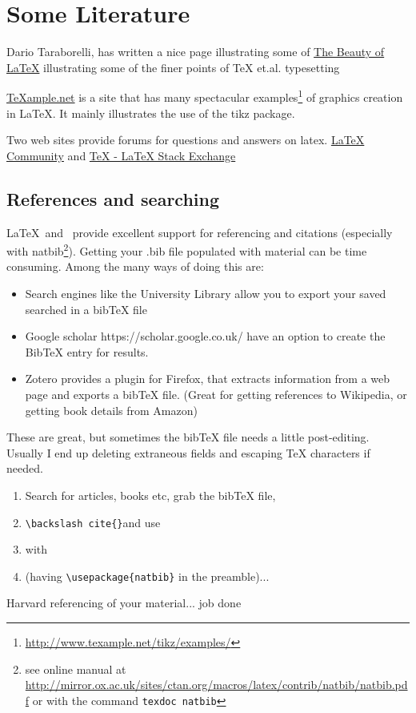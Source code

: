 
\chapter{Some Literature}

Dario Taraborelli, has written a nice page illustrating some of \href{http://nitens.org/taraborelli/latex}{The Beauty of LaTeX} illustrating some of the finer points of TeX et.al. typesetting

\url{TeXample.net} is a site that has many spectacular examples\footnote{\url{http://www.texample.net/tikz/examples/}} of graphics creation in LaTeX. It mainly illustrates the use of the tikz package.

Two web sites provide forums for questions and answers on latex. \href{http://www.latex-community.org/}{LaTeX Community} and \href{http://tex.stackexchange.com/}{TeX - LaTeX Stack Exchange}

\section{References and searching}

\LaTeX\ and \BibTeX\ provide excellent support for referencing and citations (especially with natbib\footnote{see online manual at \url{http://mirror.ox.ac.uk/sites/ctan.org/macros/latex/contrib/natbib/natbib.pdf} or with the command \texttt{texdoc natbib}}).  Getting your .bib file populated with material can be time consuming. Among the many ways of doing this are:
\begin{itemize}
\item    Search engines like the University Library allow you to export your saved searched in a bibTeX file
\item    Google scholar https://scholar.google.co.uk/ have an option to create the BibTeX entry for results.
\item    Zotero provides a plugin for Firefox, that extracts information from a web page and exports a bibTeX file. (Great for getting references to Wikipedia, or getting book details from Amazon)
\end{itemize}

These are great, but sometimes the bibTeX file needs a little post-editing. Usually I end up deleting extraneous fields and escaping TeX characters if needed.

\begin{enumerate}
\item Search for articles, books etc, grab the bibTeX file,
\item \verb"\backslash cite{}"and use
\item \verb"" with
\item \verb"" (having \verb"\usepackage{natbib}" in the preamble)...
\end{enumerate}
 Harvard referencing of your material... job done
